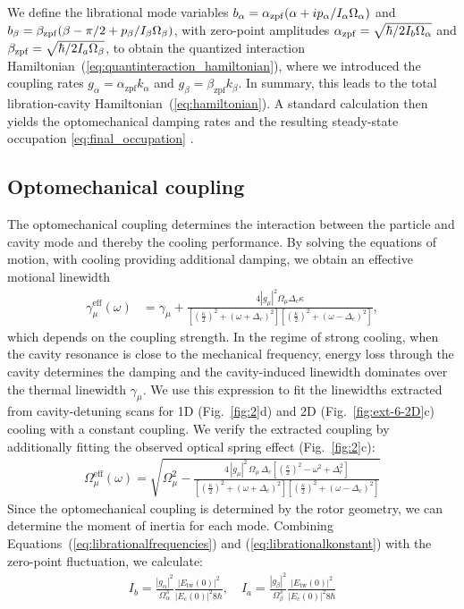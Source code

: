 \documentclass[reprint, amsmath, amssymb, superscriptaddress,showkeys,aps,pra]{revtex4-2}
\begin{document}
We define the librational mode variables $b_\alpha = \alpha_{\rm zpf} (\alpha + i p_\alpha/I_\alpha \Omega_\alpha)$ and $b_\beta = \beta_{\rm zpf} (\beta - \pi/2 + p_\beta/I_\beta \Omega_\beta)$, with zero-point amplitudes ${\alpha}_{\rm zpf} = \sqrt{\hbar/2I_{b}\Omega_{\alpha}}$ and ${\beta}_{\rm zpf} = \sqrt{\hbar/2I_{a}\Omega_{\beta}}$, to obtain the quantized interaction Hamiltonian~(\ref{eq:quantinteraction_hamiltonian}), where we introduced the coupling rates $g_\alpha = \alpha_\text{zpf} k_\alpha$ and $g_\beta = \beta_\text{zpf} k_\beta$.
In summary, this leads to the total libration-cavity Hamiltonian~(\ref{eq:hamiltonian}).
A standard calculation then yields the optomechanical damping rates and the resulting steady-state occupation \eqref{eq:final_occupation} \cite{rudolph_theory_2021}. 


\subsection{Optomechanical coupling}
The optomechanical coupling determines the interaction between the particle and cavity mode and thereby the cooling performance. By solving the equations of motion, with cooling providing additional damping, we obtain an effective motional linewidth
\begin{align}
\gamma_\mu^{\text{eff}}(\omega) &= 
\gamma_\mu + \frac{4 |g_\mu|^2 \Omega_\mu \Delta_c \kappa}
{\left[\left( \tfrac{\kappa}{2} \right)^2 + (\omega + \Delta_c)^2 \right] \left[ \left( \tfrac{\kappa}{2} \right)^2 + (\omega - \Delta_c)^2 \right]},
\end{align}
which depends on the coupling strength.
In the regime of strong cooling, when the cavity resonance is close to the mechanical frequency, energy loss through the cavity determines the damping and the cavity-induced linewidth dominates over the thermal linewidth $\gamma_\mu$. We use this expression to fit the linewidths extracted from cavity-detuning scans for 1D (Fig.~\ref{fig:2}d) and 2D (Fig.~\ref{fig:ext-6-2D}c) cooling with a constant coupling. We verify the extracted coupling by additionally fitting the observed optical spring effect (Fig.~\ref{fig:2}c):
\begin{align}
\Omega_\mu^{\mathrm{eff}}(\omega)
= \sqrt{
\Omega_\mu^2
- \frac{4\,|g_\mu|^2\,\Omega_\mu\,\Delta_c
\left[\left(\tfrac{\kappa}{2}\right)^2 - \omega^2 + \Delta_c^2\right]}
{\left[\left(\tfrac{\kappa}{2}\right)^2 + (\omega + \Delta_c)^2\right]
 \left[\left(\tfrac{\kappa}{2}\right)^2 + (\omega - \Delta_c)^2\right]}
}
\end{align}
Since the optomechanical coupling is determined by the rotor geometry, we can determine the moment of inertia for each mode. Combining Equations~(\ref{eq:librationalfrequencies}) and (\ref{eq:librationalkonstant}) with the zero-point fluctuation, we calculate:
\begin{align}
    I_b=\frac{|g_\alpha|^2}{\Omega_\alpha^3}\frac{|E_\text{tw}(0)|^2}
    {|E_c(0)|^2 8\hbar},\quad
    I_a=\frac{|g_\beta|^2}{\Omega_\beta^3}\frac{|E_\text{tw}(0)|^2}{|E_c(0)|^2 8\hbar}
\end{align}
\end{document}
